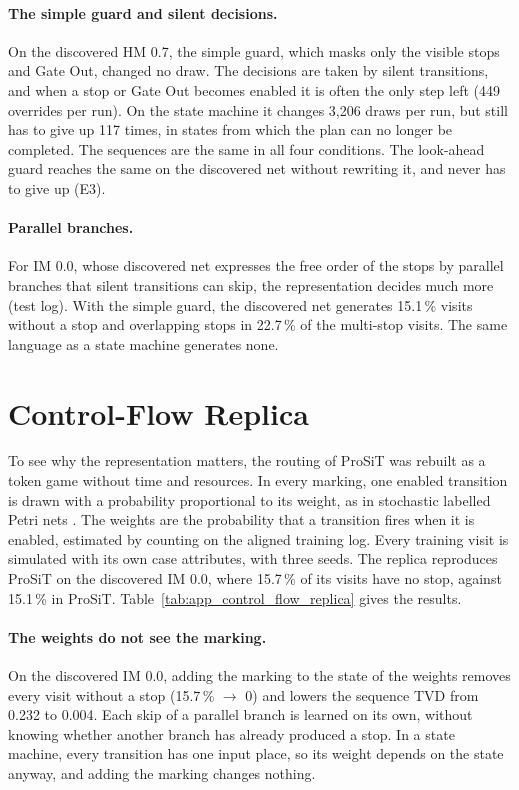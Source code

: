 

\paragraph{The simple guard and silent decisions.} On the discovered HM 0.7, the
simple guard, which masks only the visible stops and Gate Out, changed no draw. The
decisions are taken by silent transitions, and when a stop or Gate Out becomes
enabled it is often the only step left (449 overrides per run). On the state
machine it changes 3,206 draws per run, but still has to give up 117 times, in
states from which the plan can no longer be completed. The sequences are the same in all four
conditions. The look-ahead guard reaches the same on the discovered net without
rewriting it, and never has to give up (E3).


\paragraph{Parallel branches.} For IM 0.0, whose discovered net expresses the
free order of the stops by parallel branches that silent transitions can skip,
the representation decides much more (test log). With the simple guard, the discovered net generates 15.1\,\% visits without
a stop and overlapping stops in 22.7\,\% of the multi-stop visits. The same
language as a state machine generates none.


\section{Control-Flow Replica}
\label{app:replica_token_game}
To see why the representation matters, the routing of ProSiT was rebuilt as a
token game without time and resources. In every marking, one enabled transition
is drawn with a probability proportional to its weight, as in stochastic labelled
Petri nets \cite{burke2020stochasticPD,mannhardt2023stochasticProcessesModelling}.
The weights are the probability that a transition fires when it is enabled,
estimated by counting on the aligned training log. Every training visit is
simulated with its own case attributes, with three seeds. The replica reproduces ProSiT
on the discovered IM 0.0, where 15.7\,\% of its visits have no stop, against 15.1\,\% in
ProSiT. Table~\ref{tab:app_control_flow_replica} gives the results.



\paragraph{The weights do not see the marking.} On the discovered IM 0.0, adding
the marking to the state of the weights removes every visit without a stop
(15.7\,\% $\rightarrow$ 0) and lowers the sequence TVD from 0.232 to 0.004. Each
skip of a parallel branch is learned on its own, without knowing whether another
branch has already produced a stop. In a state machine, every transition has one
input place, so its weight depends on the state anyway, and adding the marking
changes nothing.

